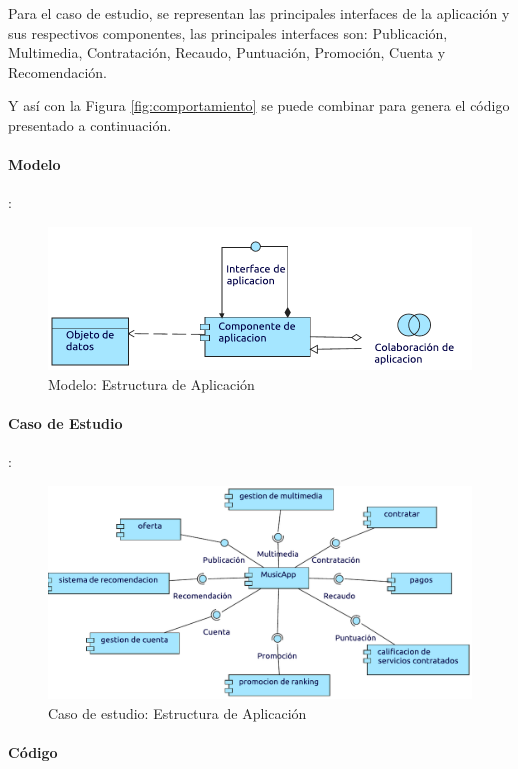 Para el caso de estudio, se representan las principales interfaces de la aplicación y sus respectivos componentes, las principales interfaces son: Publicación, Multimedia, Contratación, Recaudo, Puntuación, Promoción, Cuenta y Recomendación. \vspace{\baselineskip}

Y así con la Figura \ref{fig:comportamiento} se puede combinar para genera el código presentado a continuación.
\paragraph{Modelo}:
\begin{figure}[h!]
	\centering
	\includegraphics[width=\linewidth]{Desarrollo/ArquitecturaEmpresarial/Aplicacion/imgs/estructuraMetamodelo.pdf}
	\caption{Modelo: Estructura de Aplicación}
\end{figure}
\newpage
\paragraph{Caso de Estudio}:

\begin{figure}[h!]
	\centering
	\includegraphics[width=\linewidth]{Desarrollo/ArquitecturaEmpresarial/Aplicacion/imgs/estructura.pdf}
	\caption{Caso de estudio: Estructura de Aplicación }
\end{figure}


\paragraph{Código}

